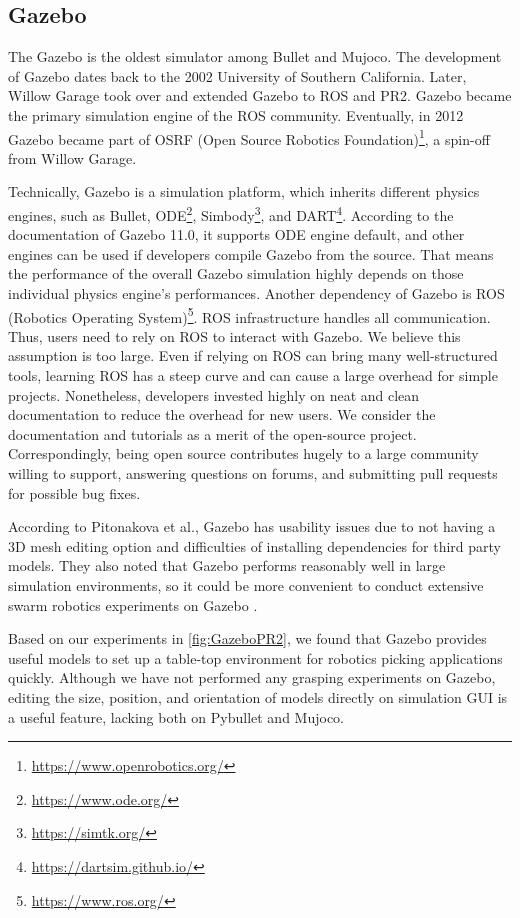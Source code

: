 \subsection{Gazebo}

The Gazebo is the oldest simulator among Bullet and Mujoco. The development of Gazebo dates back to the 2002 University of Southern California. Later, Willow Garage took over and extended Gazebo to ROS and PR2. Gazebo became the primary simulation engine of the ROS community. Eventually, in 2012 Gazebo became part of OSRF (Open Source Robotics Foundation)\footnote{\url{https://www.openrobotics.org/}}, a spin-off from Willow Garage.

Technically, Gazebo is a simulation platform, which inherits different physics engines, such as Bullet, ODE\footnote{\url{https://www.ode.org/}}, Simbody\footnote{\url{https://simtk.org/}}, and DART\footnote{\url{https://dartsim.github.io/}}. According to the documentation of Gazebo 11.0, it supports ODE engine default, and other engines can be used if developers compile Gazebo from the source. That means the performance of the overall Gazebo simulation highly depends on those individual physics engine’s performances.  Another dependency of Gazebo is ROS (Robotics Operating System)\footnote{\url{https://www.ros.org/}}. ROS infrastructure handles all communication. Thus, users need to rely on ROS to interact with Gazebo. We believe this assumption is too large. Even if relying on ROS can bring many well-structured tools, learning ROS has a steep curve and can cause a large overhead for simple projects.
Nonetheless, developers invested highly on neat and clean documentation to reduce the overhead for new users. We consider the documentation and tutorials as a merit of the open-source project. Correspondingly, being open source contributes hugely to a large community willing to support, answering questions on forums, and submitting pull requests for possible bug fixes. 

According to Pitonakova et al., Gazebo has usability issues due to not having a 3D mesh editing option and difficulties of installing dependencies for third party models. They also noted that Gazebo performs reasonably well in large simulation environments, so it could be more convenient to conduct extensive swarm robotics experiments on Gazebo \cite{Pitonakova2018}.  

Based on our experiments in \ref{fig:GazeboPR2}, we found that Gazebo provides useful models to set up a table-top environment for robotics picking applications quickly. Although we have not performed any grasping experiments on Gazebo, editing the size, position, and orientation of models directly on simulation GUI is a useful feature, lacking both on Pybullet and Mujoco.


